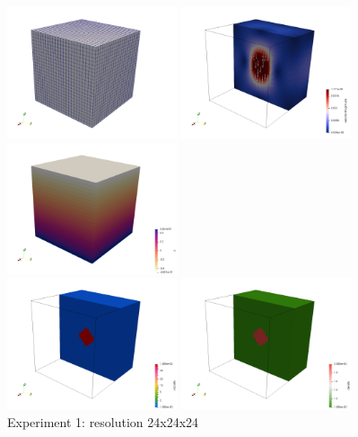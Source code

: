\begin{center}
\includegraphics[width=5cm]{python_codes/fieldstone_10/results/grid}
\includegraphics[width=5cm]{python_codes/fieldstone_10/results/vel}
\includegraphics[width=5cm]{python_codes/fieldstone_10/results/press}\\
\includegraphics[width=5cm]{python_codes/fieldstone_10/results/visc}
\includegraphics[width=5cm]{python_codes/fieldstone_10/results/dens}\\
{\small Experiment 1: resolution 24x24x24}
\end{center}

